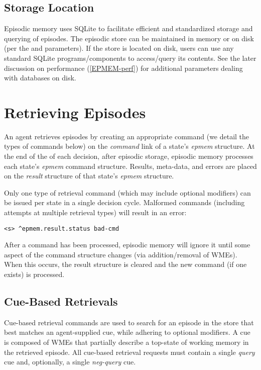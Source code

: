 \subsection{Storage Location}
Episodic memory uses SQLite to facilitate efficient and standardized storage and querying of episodes.  
The episodic store can be maintained in memory or on disk (per the  and  parameters).  
If the store is located on disk, users can use any standard SQLite programs/components to access/query its contents. 
See the later discussion on performance (\ref{EPMEM-perf}) for additional parameters dealing with databases on disk.

\section{Retrieving Episodes}
\label{EPMEM-retrieval}

An agent retrieves episodes by creating an appropriate command (we detail the types of commands below) on the \emph{command} link of a state's \emph{epmem} structure. 
At the end of the  of each decision, after episodic storage, episodic memory processes each state's \emph{epmem} command structure.  
Results, meta-data, and errors are placed on the \emph{result} structure of that state's \emph{epmem} structure.

Only one type of retrieval command (which may include optional modifiers) can be issued per state in a single decision cycle.  
Malformed commands (including attempts at multiple retrieval types) will result in an error:

\begin{verbatim}
<s> ^epmem.result.status bad-cmd
\end{verbatim}

After a command has been processed, episodic memory will ignore it until some aspect of the command structure changes (via addition/removal of WMEs).  
When this occurs, the result structure is cleared and the new command (if one exists) is processed.

\subsection{Cue-Based Retrievals}
Cue-based retrieval commands are used to search for an episode in the store that best matches an agent-supplied cue, while adhering to optional modifiers.  
A cue is composed of WMEs that partially describe a top-state of working memory in the retrieved episode.  
All cue-based retrieval requests must contain a single \emph{query} cue and, optionally, a single \emph{neg-query} cue.  

